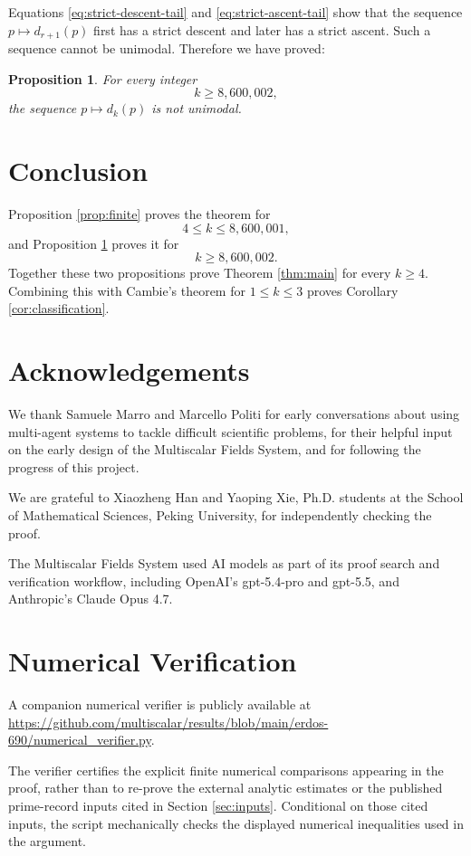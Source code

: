 \documentclass[11pt]{article}
\numberwithin{equation}{section}
\theoremstyle{plain}
\newtheorem{proposition}[theorem]{Proposition}
\theoremstyle{definition}
\theoremstyle{remark}
\begin{document}
Equations \eqref{eq:strict-descent-tail} and \eqref{eq:strict-ascent-tail} show that the sequence \(p\mapsto d_{r+1}(p)\) first has a strict descent and later has a strict ascent.  Such a sequence cannot be unimodal.  Therefore we have proved:

\begin{proposition}\label{prop:tail}
For every integer
\[
        k\ge8{,}600{,}002,
\]
the sequence \(p\mapsto d_k(p)\) is not unimodal.
\end{proposition}

\section{Conclusion}

Proposition \ref{prop:finite} proves the theorem for
\[
        4\le k\le8{,}600{,}001,
\]
and Proposition \ref{prop:tail} proves it for
\[
        k\ge8{,}600{,}002.
\]
Together these two propositions prove Theorem \ref{thm:main} for every \(k\ge4\).  Combining this with Cambie's theorem for \(1\le k\le3\) proves Corollary \ref{cor:classification}.

\section*{Acknowledgements}

We thank Samuele Marro and Marcello Politi for early conversations about using multi-agent systems to tackle difficult scientific problems, for their helpful input on the early design of the Multiscalar Fields System, and for following the progress of this project.

We are grateful to Xiaozheng Han and Yaoping Xie, Ph.D. students at the School of Mathematical Sciences, Peking University, for independently checking the proof.

The Multiscalar Fields System used AI models as part of its proof search and verification workflow, including OpenAI’s gpt-5.4-pro and gpt-5.5, and Anthropic’s Claude Opus 4.7.

\appendix
\section{Numerical Verification}\label{app:verification}

A companion numerical verifier is publicly available at
\url{https://github.com/multiscalar/results/blob/main/erdos-690/numerical_verifier.py}.

The verifier certifies the explicit finite numerical comparisons appearing in the proof, rather than to re-prove the external analytic estimates or the published prime-record inputs cited in Section \ref{sec:inputs}. Conditional on those cited inputs, the script mechanically checks the displayed numerical inequalities used in the argument.
\end{document}
